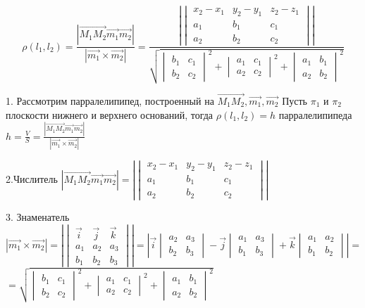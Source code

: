 \documentclass[a4paper, 10pt]{article}
\newcommand{\bvec}[1]{\overrightarrow{#1}}
\renewcommand{\a}{\vec{a}}
\renewcommand{\b}{\vec{b}}
\renewcommand{\i}{\vec{i}}
\renewcommand{\j}{\vec{j}}
\renewcommand{\k}{\vec{k}}
\begin{document}
$$\rho(l_1, l_2) = \frac{ |\bvec{M_1M_2}\vec{m_1}\vec{m_2}| }{ |\vec{m_1}\times\vec{m_2}| }=
\frac{ |\begin{vmatrix}x_2-x_1&y_2-y_1&z_2-z_1\\a_1&b_1&c_1\\a_2&b_2&c_2\end{vmatrix}| }
    {\sqrt{\begin{vmatrix}b_1&c_1\\b_2&c_2\end{vmatrix}^2+
    \begin{vmatrix}a_1&c_1\\a_2&c_2\end{vmatrix}^2+
    \begin{vmatrix}a_1&b_1\\a_2&b_2\end{vmatrix}^2}}$$

1. Рассмотрим парралелипипед, построенный на $\bvec{M_1M_2}, \vec{m_1}, \vec{m_2}$
Пусть $\pi_1$ и $\pi_2$ плоскости нижнего и верхнего оснований, тогда $\rho(l_1, l_2) = h$ парралелипипеда
$h = \frac{V}{S} = \frac{ |\bvec{M_1M_2}\vec{m_1}\vec{m_2}| }{ |\vec{m_1}\times\vec{m_2}| }$

2.Числитель $|\bvec{M_1M_2}\vec{m_1}\vec{m_2}| =  |\begin{vmatrix}x_2-x_1&y_2-y_1&z_2-z_1\\
a_1&b_1&c_1\\a_2&b_2&c_2\end{vmatrix}|$

3. Знаменатель $|\vec{m_1}\times\vec{m_2}| = |\begin{vmatrix}
    \i&\j&\k\\
    a_1 & a_2 & a_3\\
    b_1 & b_2 & b_3
\end{vmatrix}| = |\i
\begin{vmatrix}
    a_2 & a_3\\
    b_2 & b_3
\end{vmatrix} - \j
\begin{vmatrix}
    a_1 & a_3\\
    b_1 & b_3
\end{vmatrix} + \k
\begin{vmatrix}
    a_1 & a_2\\
    b_1 & b_2
\end{vmatrix}| = $ \\
$=\sqrt{\begin{vmatrix}b_1&c_1\\b_2&c_2\end{vmatrix}^2+
\begin{vmatrix}a_1&c_1\\a_2&c_2\end{vmatrix}^2+
\begin{vmatrix}a_1&b_1\\a_2&b_2\end{vmatrix}^2}$
\end{document}
